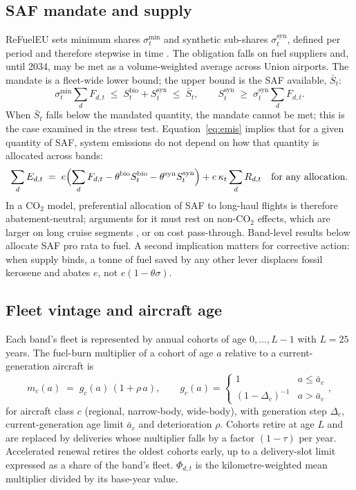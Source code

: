 \documentclass[preprint, 12pt, authoryear]{elsarticle}
\begin{document}
\subsection{SAF mandate and supply}

ReFuelEU sets minimum shares $\sigma^{\min}_t$ and synthetic sub-shares
$\sigma^{\mathrm{syn}}_t$, defined per period and therefore stepwise in time
\citep{eu2023}. The obligation falls on fuel suppliers and, until 2034, may be
met as a volume-weighted average across Union airports. The mandate is a
fleet-wide lower bound; the upper bound is the SAF available, $\bar S_t$:
\begin{equation}
\label{eq:saf}
\sigma^{\min}_t \sum_d F_{d,t} \;\le\; S^{\mathrm{bio}}_t + S^{\mathrm{syn}}_t \;\le\; \bar S_t,
\qquad
S^{\mathrm{syn}}_t \;\ge\; \sigma^{\mathrm{syn}}_t \sum_d F_{d,t}.
\end{equation}
When $\bar S_t$ falls below the mandated quantity, the mandate cannot be met;
this is the case examined in the stress test. Equation~\eqref{eq:emis} implies
that for a given quantity of SAF, system emissions do not depend on how that
quantity is allocated across bands:
\begin{equation}
\label{eq:neutral}
\sum_d E_{d,t} \;=\; e\Bigl(\sum_d F_{d,t} - \theta^{\mathrm{bio}}S^{\mathrm{bio}}_t
- \theta^{\mathrm{syn}}S^{\mathrm{syn}}_t\Bigr) + e\,\kappa_t\sum_d R_{d,t}
\quad\text{for any allocation.}
\end{equation}
In a CO$_2$ model, preferential allocation of SAF to long-haul flights is
therefore abatement-neutral; arguments for it must rest on non-CO$_2$ effects,
which are larger on long cruise segments \citep{voigt2021, lee2021}, or on cost
pass-through. Band-level results below allocate SAF pro rata to fuel. A second
implication matters for corrective action: when supply binds, a tonne of fuel
saved by any other lever displaces fossil kerosene and abates $e$, not
$e(1-\theta\sigma)$.

\subsection{Fleet vintage and aircraft age}
\label{sec:fleet}

Each band's fleet is represented by annual cohorts of age $0,\dots,L-1$ with
$L=25$ years. The fuel-burn multiplier of a cohort of age $a$ relative to a
current-generation aircraft is
\begin{equation}
\label{eq:vintage}
m_{c}(a) \;=\; g_c(a)\,(1+\rho\,a), \qquad
g_c(a) = \begin{cases} 1 & a \le \bar a_c\\ (1-\Delta_c)^{-1} & a>\bar a_c\end{cases},
\end{equation}
for aircraft class $c$ (regional, narrow-body, wide-body), with generation step
$\Delta_c$, current-generation age limit $\bar a_c$ and deterioration $\rho$.
Cohorts retire at age $L$ and are replaced by deliveries whose multiplier falls
by a factor $(1-\tau)$ per year. Accelerated renewal retires the oldest cohorts
early, up to a delivery-slot limit expressed as a share of the band's fleet.
$\Phi_{d,t}$ is the kilometre-weighted mean multiplier divided by its base-year
value.
\end{document}

